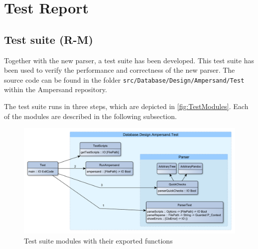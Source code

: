 
\section{Test Report}
\label{sec:tests}

\subsection{Test suite (R-M)}
  Together with the new parser, a test suite has been developed.
  This test suite has been used to verify the performance and correctness of the new parser.
  The source code can be found in the folder \texttt{src/Database/Design/Ampersand/Test} within the Ampersand repository.

  The test suite runs in three steps, which are depicted in \autoref{fig:TestModules}.
  Each of the modules are described in the following subsection.
  \begin{figure}[ht]%
    \includegraphics[width=\columnwidth]{Figures/TestModules}
    \caption{Test suite modules with their exported functions}
    \label{fig:TestModules}
  \end{figure}%

